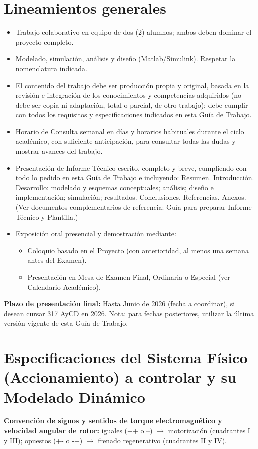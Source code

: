 \documentclass[11pt,a4paper]{article}
\begin{document}
\section{Lineamientos generales}
\begin{itemize}
    \item Trabajo colaborativo en equipo de dos (2) alumnos; ambos deben dominar el proyecto completo.
    \item Modelado, simulación, análisis y diseño (Matlab/Simulink). Respetar la nomenclatura indicada.
    \item El contenido del trabajo debe ser producción propia y original, basada en la revisión e integración de los conocimientos y competencias adquiridos (no debe ser copia ni adaptación, total o parcial, de otro trabajo); debe cumplir con todos los requisitos y especificaciones indicados en esta Guía de Trabajo.
    \item Horario de Consulta semanal en días y horarios habituales durante el ciclo académico, con suficiente anticipación, para consultar todas las dudas y mostrar avances del trabajo.
    \item Presentación de Informe Técnico escrito, completo y breve, cumpliendo con todo lo pedido en esta Guía de Trabajo e incluyendo: Resumen. Introducción. Desarrollo: modelado y esquemas conceptuales; análisis; diseño e implementación; simulación; resultados. Conclusiones. Referencias. Anexos. (Ver documentos complementarios de referencia: Guía para preparar Informe Técnico y Plantilla.)
    \item Exposición oral presencial y demostración mediante:
    \begin{itemize}
        \item Coloquio basado en el Proyecto (con anterioridad, al menos una semana antes del Examen).
        \item Presentación en Mesa de Examen Final, Ordinaria o Especial (ver Calendario Académico).
    \end{itemize}
\end{itemize}
\textbf{Plazo de presentación final:} Hasta Junio de 2026 (fecha a coordinar), si desean cursar 317 AyCD en 2026. Nota: para fechas posteriores, utilizar la última versión vigente de esta Guía de Trabajo.

\section{Especificaciones del Sistema Físico (Accionamiento) a controlar y su Modelado Dinámico}
\textbf{Convención de signos y sentidos de torque electromagnético y velocidad angular de rotor:} iguales (++ o --) $\rightarrow$ motorización (cuadrantes I y III); opuestos (+- o -+) $\rightarrow$ frenado regenerativo (cuadrantes II y IV).
\end{document}
